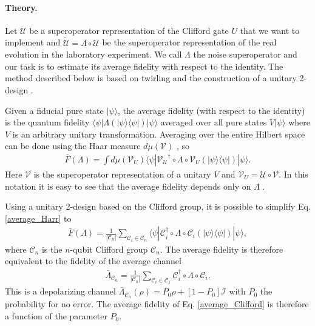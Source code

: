 \documentclass[prl,twocolumn,showpacs,superscriptaddress]{revtex4-1}
\newcommand{\bra}[1]{\langle #1|}
\newcommand{\ket}[1]{|#1\rangle}
\newcommand{\R}[1]{{\color{red}#1}}
\begin{document}
\paragraph*{Theory.}

Let  $\mathcal{U}$ be a superoperator representation of  the  Clifford gate $U$ that we want to implement and $\tilde{\mathcal{U}} =\Lambda\circ \mathcal{U}$ be the superoperator representation of the real evolution in the laboratory experiment.  We call $\Lambda$ the noise superoperator and our task is to estimate its  average fidelity with respect to the identity. The method described below is based on twirling \cite{Bennett1996} and the  construction of  a unitary 2-design \cite{Dankert2009}.

Given  a fiducial  pure state  $\ket\psi$, the average fidelity (with respect to the identity) is the quantum fidelity $\bra\psi\Lambda(\ket\psi\bra\psi)\ket\psi$ averaged over all pure states $V\ket\psi$ where $V$ is an arbitrary unitary transformation. Averaging over the entire Hilbert space can be done using the Haar measure   $d\mu(\mathcal{V})$ \cite{Emerson2005},  so
\begin{align} \label{average_Harr}
\bar{F}(\Lambda) = \int d\mu(\mathcal{V}_U) \bra{\psi} \mathcal{V_U}^{\dagger} \circ \Lambda \circ  \mathcal{V}_U(\ket{\psi} \bra{\psi}) \ket{\psi}.
\end{align}
Here $\mathcal{V}$ is the superoperator representation of a unitary $V$ and $\mathcal{V}_U=\mathcal{U}\circ\mathcal{V}$. In this notation it is easy to see that the average fidelity depends only on $\Lambda$ .

Using a unitary 2-design based on the Clifford group, it is possible to simplify Eq. \eqref{average_Harr} to
\begin{align} \label{average_Clifford}
\bar{F}(\Lambda) =  \frac{1}{|\mathcal{C}_n|}\sum_{\mathcal{C}_i\in \mathcal{C}_n}\bra{\psi} \mathcal{C}_i^{\dagger} \circ \Lambda \circ \mathcal{C}_i(\ket{\psi} \bra{\psi}) \ket{\psi},
\end{align}
where $\mathcal{C}_n$  is the $n$-qubit Clifford group $\mathcal{C}_n$.  The average fidelity is therefore equivalent to the fidelity of the average channel
 \begin{align} \label{Cn_twirl}
\bar{\Lambda}_{\mathcal{C}_n} = \frac{1}{|\mathcal{C}_n|}\sum_{\mathcal{C}_i\in \mathcal{C}_1} \mathcal{C}_i^{\dagger} \circ \Lambda \circ \mathcal{C}_i.
\end{align}
This is a depolarizing channel $\bar{\Lambda}_{\mathcal{C}_n}(\rho)=P_0\rho+[1-P_0]\mathcal{I}$ with $P_0$ the  probability for no error. The average fidelity of Eq. \eqref{average_Clifford} is therefore a function of the parameter $P_0$.
\end{document}
